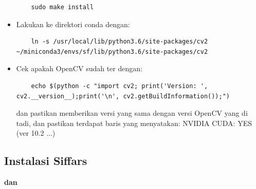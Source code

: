 \begin{itemize}
  \begin{lstlisting}
    sudo make install
  \end{lstlisting}

  \item Lakukan  ke direktori  conda dengan:
  
  \begin{lstlisting}
    ln -s /usr/local/lib/python3.6/site-packages/cv2 ~/miniconda3/envs/sf/lib/python3.6/site-packages/cv2
  \end{lstlisting}

  \item Cek apakah OpenCV sudah ter dengan:
  
  \begin{lstlisting}
    echo $(python -c "import cv2; print('Version: ', cv2.__version__);print('\n', cv2.getBuildInformation());")
  \end{lstlisting}

  dan pastikan  memberikan versi yang sama dengan versi OpenCV yang di tadi, dan pastikan terdapat baris yang menyatakan: NVIDIA CUDA: YES (ver 10.2 ...)

\end{itemize}

\subsection{Instalasi Siffars}
\textbf{ dan }

